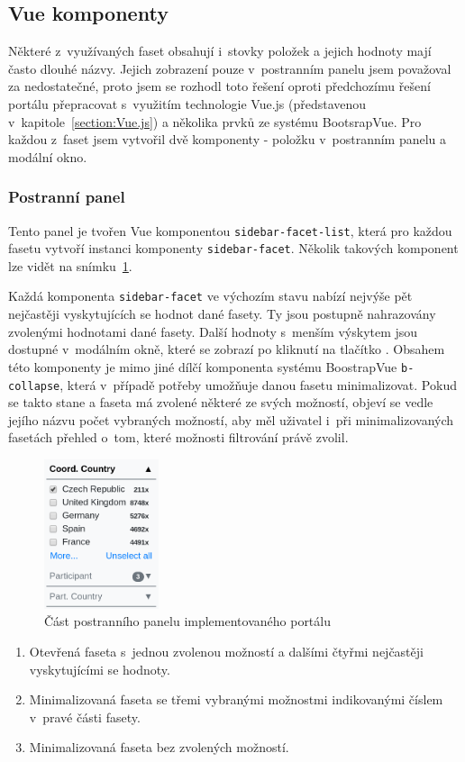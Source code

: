\subsection{Vue komponenty}
Některé z~využívaných faset obsahují i~stovky položek a jejich hodnoty mají často dlouhé názvy. Jejich zobrazení pouze v~postranním panelu jsem považoval za nedostatečné, proto jsem se rozhodl toto řešení oproti předchozímu řešení portálu přepracovat s~využitím technologie Vue.js (představenou v~kapitole~\ref{section:Vue.js}) a několika prvků ze systému BootsrapVue. Pro každou z~faset jsem vytvořil dvě komponenty - položku v~postranním panelu a modální okno.

\subsubsection*{Postranní panel}\label{section:sidebar}
Tento panel je tvořen Vue komponentou \texttt{sidebar-facet-list}, která pro každou fasetu vytvoří instanci komponenty \texttt{sidebar-facet}. Několik takových komponent lze vidět na snímku~\ref{img:sidebar}.

Každá komponenta \texttt{sidebar-facet} ve výchozím stavu nabízí nejvýše pět nejčastěji vyskytujících se hodnot dané fasety. Ty jsou postupně nahrazovány zvolenými hodnotami dané fasety. Další hodnoty s~menším výskytem jsou dostupné v~modálním okně, které se zobrazí po kliknutí na tlačítko . Obsahem této komponenty je mimo jiné dílčí komponenta systému BoostrapVue \texttt{b-collapse}, která v~případě potřeby umožňuje danou fasetu minimalizovat. Pokud se takto stane a faseta má zvolené některé ze svých možností, objeví se vedle jejího názvu počet vybraných možností, aby měl uživatel i~při minimalizovaných fasetách přehled o~tom, které možnosti filtrování právě zvolil.

\begin{figure}[H]
	\centering
	\includegraphics[width=0.3\textwidth]{obrazky-figures/my-facet.png}
	\caption{Část postranního panelu implementovaného portálu}
	\label{img:sidebar}
\end{figure}
\begin{enumerate}
    \item Otevřená faseta  s~jednou zvolenou možností a dalšími čtyřmi nejčastěji vyskytujícími se hodnoty. %
    \item Minimalizovaná faseta  se třemi vybranými možnostmi indikovanými číslem v~pravé části fasety.
    \item Minimalizovaná faseta  bez zvolených možností.
\end{enumerate}



